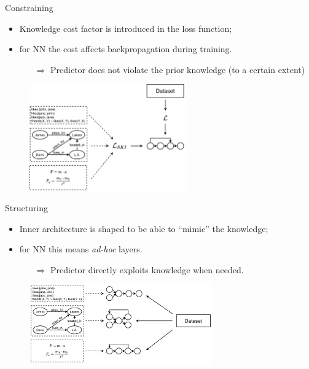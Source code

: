 \documentclass[presentation]{beamer}\mode<presentation>{\usetheme{AMSBolognaFC}}
\begin{document}
\begin{frame}[c]{Constraining}
    \begin{itemize}
        \item Knowledge cost factor is introduced in the loss function;
        \item for NN the cost affects backpropagation during training.
        \begin{itemize}
            \item[$\Rightarrow$] Predictor does not violate the prior knowledge (to a certain extent)
        \end{itemize} 
    \end{itemize}
    
    \begin{figure}
        \centering
        \includegraphics[width=0.6\textwidth]{figures/ski-constraining}
    \end{figure}
\end{frame}

\begin{frame}[c]{Structuring}
    \begin{itemize}
        \item Inner architecture is shaped to be able to ``mimic'' the knowledge;
        \item for NN this means \emph{ad-hoc} layers.
        \begin{itemize}
            \item[$\Rightarrow$] Predictor directly exploits knowledge when needed.
        \end{itemize} 
    \end{itemize}
    
    \begin{figure}
        \centering
        \includegraphics[width=0.7\textwidth]{figures/ski-structuring}
    \end{figure}
\end{frame}
\end{document}
